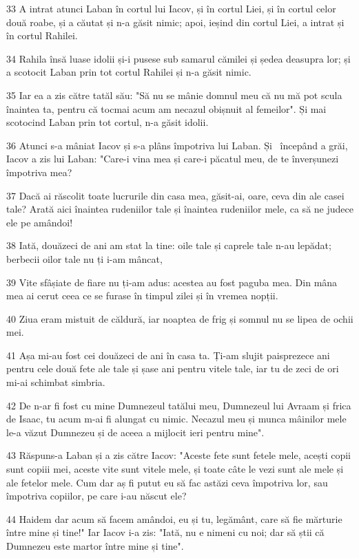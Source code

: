 \par 33 A intrat atunci Laban în cortul lui Iacov, și în cortul Liei, și în cortul celor două roabe, și a căutat și n-a găsit nimic; apoi, ieșind din cortul Liei, a intrat și în cortul Rahilei.
\par 34 Rahila însă luase idolii și-i pusese sub samarul cămilei și ședea deasupra lor; și a scotocit Laban prin tot cortul Rahilei și n-a găsit nimic.
\par 35 Iar ea a zis către tatăl său: "Să nu se mânie domnul meu că nu mă pot scula înaintea ta, pentru că tocmai acum am necazul obișnuit al femeilor". Și mai scotocind Laban prin tot cortul, n-a găsit idolii.
\par 36 Atunci s-a mâniat Iacov și s-a plâns împotriva lui Laban. Și  începând a grăi, Iacov a zis lui Laban: "Care-i vina mea și care-i păcatul meu, de te înverșunezi împotriva mea?
\par 37 Dacă ai răscolit toate lucrurile din casa mea, găsit-ai, oare, ceva din ale casei tale? Arată aici înaintea rudeniilor tale și înaintea rudeniilor mele, ca să ne judece ele pe amândoi!
\par 38 Iată, douăzeci de ani am stat la tine: oile tale și caprele tale n-au lepădat; berbecii oilor tale nu ți i-am mâncat,
\par 39 Vite sfâșiate de fiare nu ți-am adus: acestea au fost paguba mea. Din mâna mea ai cerut ceea ce se furase în timpul zilei și în vremea nopții.
\par 40 Ziua eram mistuit de căldură, iar noaptea de frig și somnul nu se lipea de ochii mei.
\par 41 Așa mi-au fost cei douăzeci de ani în casa ta. Ți-am slujit paisprezece ani pentru cele două fete ale tale și șase ani pentru vitele tale, iar tu de zeci de ori mi-ai schimbat simbria.
\par 42 De n-ar fi fost cu mine Dumnezeul tatălui meu, Dumnezeul lui Avraam și frica de Isaac, tu acum m-ai fi alungat cu nimic. Necazul meu și munca mâinilor mele le-a văzut Dumnezeu și de aceea a mijlocit ieri pentru mine".
\par 43 Răspuns-a Laban și a zis către Iacov: "Aceste fete sunt fetele mele, acești copii sunt copiii mei, aceste vite sunt vitele mele, și toate câte le vezi sunt ale mele și ale fetelor mele. Cum dar aș fi putut eu să fac astăzi ceva împotriva lor, sau împotriva copiilor, pe care i-au născut ele?
\par 44 Haidem dar acum să facem amândoi, eu și tu, legământ, care să fie mărturie între mine și tine!" Iar Iacov i-a zis: "Iată, nu e nimeni cu noi; dar să știi că Dumnezeu este martor între mine și tine".
